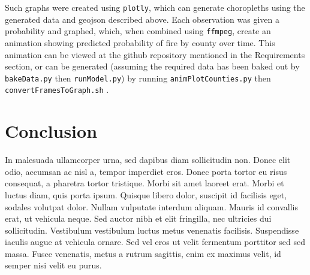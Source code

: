 \documentclass{article}
\begin{document}
Such graphs were created using \lstinline|plotly|, which can generate choropleths using the generated data and geojson described above. Each observation was given a probability and graphed, which, when combined using \lstinline|ffmpeg|, create an animation showing predicted probability of fire by county over time. This animation can be viewed at the github repository mentioned in the Requirements section, or can be generated (assuming the required data has been baked out by \lstinline|bakeData.py| then \lstinline|runModel.py|) by running \lstinline|animPlotCounties.py| then \lstinline|convertFramesToGraph.sh| .


\section{Conclusion}

In malesuada ullamcorper urna, sed dapibus diam sollicitudin non. Donec elit odio, accumsan ac nisl a, tempor imperdiet eros. Donec porta tortor eu risus consequat, a pharetra tortor tristique. Morbi sit amet laoreet erat. Morbi et luctus diam, quis porta ipsum. Quisque libero dolor, suscipit id facilisis eget, sodales volutpat dolor. Nullam vulputate interdum aliquam. Mauris id convallis erat, ut vehicula neque. Sed auctor nibh et elit fringilla, nec ultricies dui sollicitudin. Vestibulum vestibulum luctus metus venenatis facilisis. Suspendisse iaculis augue at vehicula ornare. Sed vel eros ut velit fermentum porttitor sed sed massa. Fusce venenatis, metus a rutrum sagittis, enim ex maximus velit, id semper nisi velit eu purus.
\end{document}

